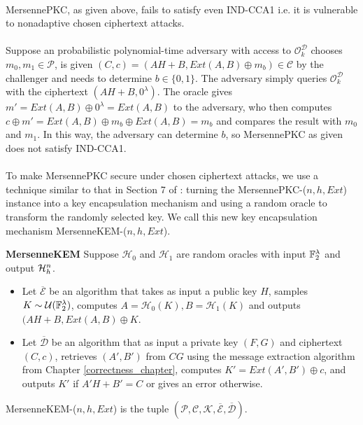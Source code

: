 \paragraph{}
MersennePKC, as given above, fails to satisfy even IND-CCA1 i.e. it is vulnerable to nonadaptive chosen ciphertext attacks.

\paragraph{}
Suppose an probabilistic polynomial-time adversary with access to $\mathcal{O}_k^\mathcal{D}$ chooses $m_0, m_1 \in \mathcal{P}$, is given $(C, c) = (AH + B, Ext(A, B) \oplus m_b) \in \mathcal{C}$ by the challenger and needs to determine $b \in \{0, 1\}$. The adversary simply queries $\mathcal{O}_k^\mathcal{D}$ with the ciphertext $(AH + B, 0^\lambda)$. The oracle gives $m' = Ext(A, B) \oplus 0^\lambda = Ext(A, B)$ to the adversary, who then computes $c \oplus m' = Ext(A, B) \oplus m_b \oplus Ext(A, B) = m_b$ and compares the result with $m_0$ and $m_1$. In this way, the adversary can determine $b$, so MersennePKC as given does not satisfy IND-CCA1.

\paragraph{}
To make MersennePKC secure under chosen ciphertext attacks, we use a technique similar to that in Section 7 of \cite{aggarwal2018new}: turning the MersennePKC-($n, h, Ext$) instance into a key encapsulation mechanism and using a random oracle to transform the randomly selected key. We call this new key encapsulation mechanism MersenneKEM-($n, h, Ext$).

\theoremstyle{definition}
\begin{definition}{\textbf{MersenneKEM}}
Suppose $\mathcal{H}_0$ and $\mathcal{H}_1$ are random oracles with input $\mathbb{F}_2^\lambda$ and output $\mathcal{H}_h^n$.
\begin{itemize}
    \item Let $\overline{\mathcal{E}}$ be an algorithm that takes as input a public key $H$, samples $K \sim \mathcal{U}(\mathbb{F}_2^\lambda)$, computes $A = \mathcal{H}_0(K), B = \mathcal{H}_1(K)$ and outputs $(AH + B, Ext(A, B) \oplus K$.
    \item Let $\overline{\mathcal{D}}$ be an algorithm that as input a private key $(F, G)$ and ciphertext $(C, c)$, retrieves $(A', B')$ from $CG$ using the message extraction algorithm from Chapter \ref{correctness_chapter}, computes $K' = Ext(A', B') \oplus c$, and outputs $K'$ if $A'H + B' = C$ or gives an error otherwise. 
\end{itemize}
MersenneKEM-($n, h, Ext$) is the tuple $(\mathcal{P}, \mathcal{C}, \mathcal{K}, \overline{\mathcal{E}}, \overline{\mathcal{D}})$.
\end{definition}

